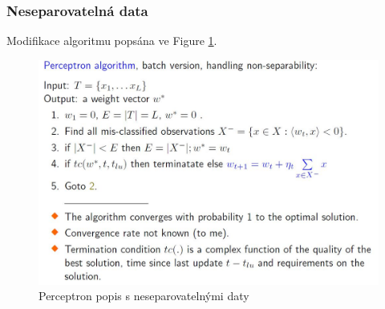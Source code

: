 \documentclass{article}
\begin{document}
\subsubsection{Neseparovatelná data}

Modifikace algoritmu popsána ve Figure \ref{fig:nonsepperceptron}. 

\begin{figure}[h]
\begin{center}
\includegraphics[width=12cm]{nonseparable_perceptron.jpg}
\caption{Perceptron popis s neseparovatelnými daty}
\label{fig:nonsepperceptron}
\end{center}
\end{figure} 
\end{document}
